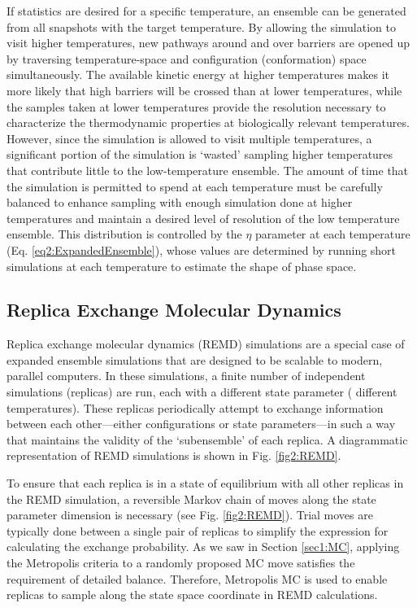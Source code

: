 If statistics are desired for a specific temperature, an ensemble can be
generated from all snapshots with the target temperature. By allowing the
simulation to visit higher temperatures, new pathways around and over barriers
are opened up by traversing temperature-space and configuration (conformation)
space simultaneously. The available kinetic energy at higher temperatures makes
it more likely that high barriers will be crossed than at lower temperatures,
while the samples taken at lower temperatures provide the resolution necessary
to characterize the thermodynamic properties at biologically relevant
temperatures. However, since the simulation is allowed to visit multiple
temperatures, a significant portion of the simulation is `wasted' sampling
higher temperatures that contribute little to the low-temperature ensemble. The
amount of time that the simulation is permitted to spend at each temperature
must be carefully balanced to enhance sampling with enough simulation done at
higher temperatures and maintain a desired level of resolution of the low
temperature ensemble. This distribution is controlled by the $\eta$ parameter at
each temperature (Eq. \ref{eq2:ExpandedEnsemble}), whose values are determined
by running short simulations at each temperature to estimate the shape of phase
space. \cite{Lyubartsev_JChemPhys_1992_v96_p1776}

\subsection{Replica Exchange Molecular Dynamics}

Replica exchange molecular dynamics (REMD) simulations are a special case of
expanded ensemble simulations that are designed to be scalable to modern,
parallel computers. In these simulations, a finite number of independent
simulations (replicas) are run, each with a different state parameter (\eg
different temperatures). These replicas periodically attempt to exchange
information between each other---either configurations or state parameters---in
such a way that maintains the validity of the `subensemble' of each replica. A
diagrammatic representation of REMD simulations is shown in Fig.
\ref{fig2:REMD}. \cite{Sugita_ChemPhysLett_1999_v314_p141}

To ensure that each replica is in a state of equilibrium with all other replicas
in the REMD simulation, a reversible Markov chain of moves along the state
parameter dimension is necessary (see Fig. \ref{fig2:REMD}). Trial moves are
typically done between a single pair of replicas to simplify the expression for
calculating the exchange probability. As we saw in Section \ref{sec1:MC},
applying the Metropolis criteria to a randomly proposed MC move satisfies the
requirement of detailed balance. Therefore, Metropolis MC is used to enable
replicas to sample along the state space coordinate in REMD calculations.

